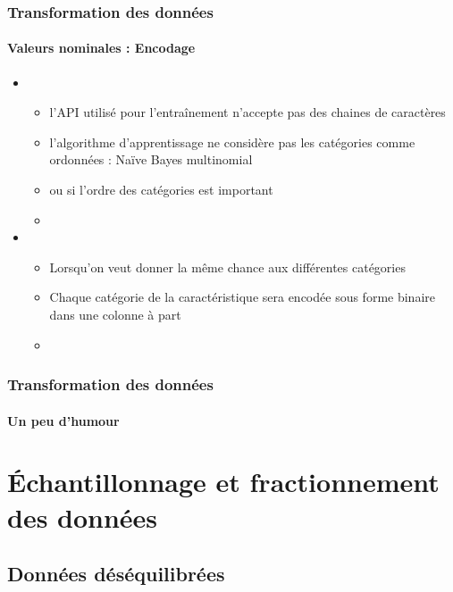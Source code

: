 \documentclass[xcolor=table]{beamer}
\begin{document}
\begin{frame}
	\frametitle{Transformation des données}
	\framesubtitle{Valeurs nominales : Encodage}
	
	\begin{itemize}
		\item {}
		\begin{itemize}
			\item l'API utilisé pour l'entraînement n'accepte pas des chaines de caractères
			\item l'algorithme d'apprentissage ne considère pas les catégories comme ordonnées : Naïve Bayes multinomial 
			\item ou si l'ordre des catégories est important
			\item {}
		\end{itemize}
		\item {}
		\begin{itemize}
			\item Lorsqu'on veut donner la même chance aux différentes catégories
			\item Chaque catégorie de la caractéristique sera encodée sous forme binaire dans une colonne à part
			\item {}
		\end{itemize}
	\end{itemize}
	
\end{frame}

\begin{frame}
	\frametitle{Transformation des données}
	\framesubtitle{Un peu d'humour}
	
	
\end{frame}

\section{Échantillonnage et fractionnement des données}

%	

\subsection{Données déséquilibrées}
\end{document}
